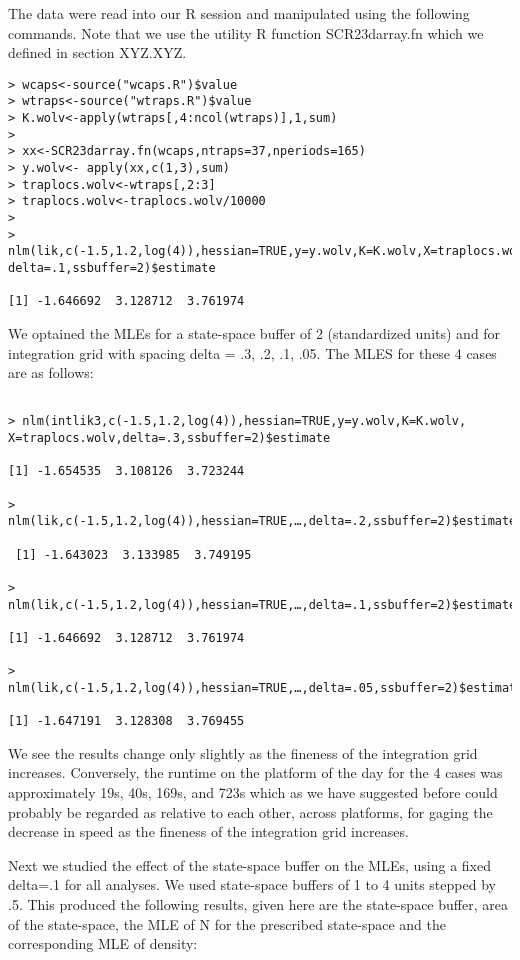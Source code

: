 The data were read into our R session and manipulated using the
following commands. Note that we use the utility R function
SCR23darray.fn which we defined in section XYZ.XYZ.

\begin{verbatim}
> wcaps<-source("wcaps.R")$value
> wtraps<-source("wtraps.R")$value
> K.wolv<-apply(wtraps[,4:ncol(wtraps)],1,sum)
> 
> xx<-SCR23darray.fn(wcaps,ntraps=37,nperiods=165)
> y.wolv<- apply(xx,c(1,3),sum)
> traplocs.wolv<-wtraps[,2:3]
> traplocs.wolv<-traplocs.wolv/10000
>
> nlm(lik,c(-1.5,1.2,log(4)),hessian=TRUE,y=y.wolv,K=K.wolv,X=traplocs.wolv,
delta=.1,ssbuffer=2)$estimate

[1] -1.646692  3.128712  3.761974

\end{verbatim}

We optained the MLEs for a state-space buffer of 2 (standardized units) and for integration grid with spacing delta = .3, .2, .1, .05. The MLES for these 4 cases are as follows:

\begin{verbatim}

> nlm(intlik3,c(-1.5,1.2,log(4)),hessian=TRUE,y=y.wolv,K=K.wolv, X=traplocs.wolv,delta=.3,ssbuffer=2)$estimate

[1] -1.654535  3.108126  3.723244

> nlm(lik,c(-1.5,1.2,log(4)),hessian=TRUE,…,delta=.2,ssbuffer=2)$estimate

 [1] -1.643023  3.133985  3.749195

> nlm(lik,c(-1.5,1.2,log(4)),hessian=TRUE,…,delta=.1,ssbuffer=2)$estimate

[1] -1.646692  3.128712  3.761974

> nlm(lik,c(-1.5,1.2,log(4)),hessian=TRUE,…,delta=.05,ssbuffer=2)$estimate

[1] -1.647191  3.128308  3.769455

\end{verbatim}

We see the results change only slightly as the fineness of the
integration grid increases. Conversely, the runtime on the platform of
the day for the 4 cases was approximately 19s, 40s, 169s, and 723s
which as we have suggested before could probably be regarded as
relative to each other, across platforms, for gaging the decrease in
speed as the fineness of the integration grid increases.

Next we studied the effect of the state-space buffer on the MLEs,
using a fixed delta=.1 for all analyses. We used state-space buffers
of 1 to 4 units stepped by .5. This produced the following results,
given here are the state-space buffer, area of the state-space, the
MLE of N for the prescribed state-space and the corresponding MLE of
density:

